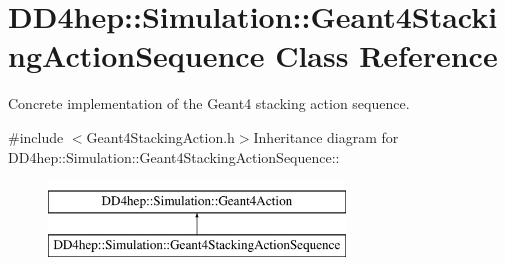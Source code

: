 \hypertarget{class_d_d4hep_1_1_simulation_1_1_geant4_stacking_action_sequence}{
\section{DD4hep::Simulation::Geant4StackingActionSequence Class Reference}
\label{class_d_d4hep_1_1_simulation_1_1_geant4_stacking_action_sequence}
}


Concrete implementation of the Geant4 stacking action sequence.  


{\ttfamily \#include $<$Geant4StackingAction.h$>$}Inheritance diagram for DD4hep::Simulation::Geant4StackingActionSequence::\begin{figure}[H]
\begin{center}
\leavevmode
\includegraphics[height=2cm]{class_d_d4hep_1_1_simulation_1_1_geant4_stacking_action_sequence}
\end{center}
\end{figure}
